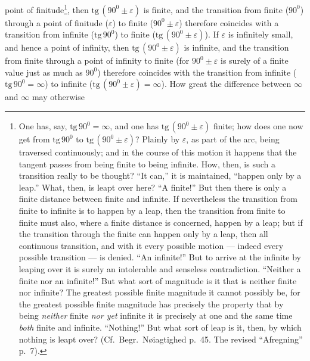 \documentclass[12pt,a4paper]{book}
\begin{document}
\setcounter{footnote}{0}
point of finitude\footnote{One has, say, $\mathrm{tg}\,90^{0} = \infty$, and
one has $\mathrm{tg}\,(90^{0} \pm \varepsilon)$ finite; how does one now get
from $\mathrm{tg}\,90^{0}$ to $\mathrm{tg}\,(90^{0} \pm \varepsilon)$? Plainly
by $\varepsilon$, as part of the arc, being traversed continuously; and in the
course of this motion it happens that the tangent passes from being finite to
being infinite. How, then, is such a transition really to be thought? ``It
can,'' it is maintained, ``happen only by a leap.'' What, then, is leapt over
here? ``A finite!'' But then there is only a finite distance between finite and
infinite. If nevertheless the transition from finite to infinite is to happen
by a leap, then the transition from finite to finite must also, where a finite
distance is concerned, happen by a leap; but if the transition through the
finite can happen only by a leap, then all continuous transition, and with it
every possible motion --- indeed every possible transition --- is denied. ``An
infinite!'' But to arrive at the infinite by leaping over it is surely an
intolerable and senseless contradiction. ``Neither a finite nor an infinite!''
But what sort of magnitude is it that is neither finite nor infinite? The
greatest possible finite magnitude it cannot possibly be, for the greatest
possible finite magnitude has precisely the property that by being
\emph{neither} finite \emph{nor yet} infinite it is precisely at one and the
same time \emph{both} finite and infinite. ``Nothing!'' But what sort of leap
is it, then, by which nothing is leapt over? (Cf.\ Begr.\ Nøiagtighed p.~45.
The revised ``Afregning'' p.~7).}, then $\mathrm{tg}\,(90^{0} \pm
\varepsilon)$ is finite, and the transition from finite ($90^{0}$) through a
point of finitude ($\varepsilon$) to finite ($90^{0} \pm \varepsilon$)
therefore coincides with a transition from infinite ($\mathrm{tg}\,90^{0}$) to
finite ($\mathrm{tg}\,(90^{0} \pm \varepsilon)$). If $\varepsilon$ is
infinitely small, and hence a point of infinity, then $\mathrm{tg}\,(90^{0} \pm
\varepsilon)$ is infinite, and the transition from finite through a point of
infinity to finite (for $90^{0} \pm \varepsilon$ is surely of a finite value
just as much as $90^{0}$) therefore coincides with the transition from infinite
($\mathrm{tg}\,90^{0} = \infty$) to infinite ($\mathrm{tg}\,(90^{0} \pm
\varepsilon) = \infty$). How great the difference between $\infty$ and $\infty$
may otherwise
\setcounter{footnote}{0}
\end{document}
